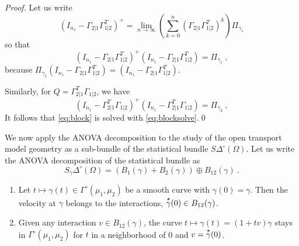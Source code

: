 \documentclass[runningheads]{llncs}
\begin{document}
\begin{proof}
  Let us write
%
\begin{equation*}
  (I_{n_1}-\Gamma_{2|1}\Gamma_{1|2}^T)^{+} = \lim_{n\to\infty} \left(\sum_{k=0}^n (\Gamma_{2|1}\Gamma_{1|2}^T)^k\right) \Pi_{\gamma_1}  
\end{equation*}
%
so that
%
\begin{equation*}
  (I_{n_1}-\Gamma_{2|1}\Gamma_{1|2}^T)^{+}(I_{n_1}-\Gamma_{2|1}\Gamma_{1|2}^T) = \Pi_{\gamma_1} \ ,
\end{equation*}
%
because $\Pi_{\gamma_1} (I_{n_1}-\Gamma_{2|1}\Gamma_{1|2}^T) = (I_{n_1}-\Gamma_{2|1}\Gamma_{1|2}^T)$.

Similarly, for $Q = \Gamma_{2|1}^T\Gamma_{1|2}$, we have
%
\begin{equation*}
  (I_{n_1}-\Gamma_{2|1}^T\Gamma_{1|2})^{+}(I_{n_1}-\Gamma_{2|1}^T\Gamma_{1|2}) = \Pi_{\gamma_2} \ ,
\end{equation*}
%
It follows that \cref{eq:block} is solved with \cref{eq:blocksolve}.\qed
\end{proof}

We now apply the ANOVA decomposition to the study of the open transport model geometry as a sub-bundle of the statistical bundle $S\Delta^\circ(\Omega)$. Let us write the ANOVA decomposition of the statistical bundle as
  \begin{equation*}
    S_\gamma \Delta^\circ(\Omega) = (B_1(\gamma) + B_2(\gamma)) \oplus B_{12}(\gamma) \ .
  \end{equation*}
 

  \begin{proposition} \begin{enumerate}\item Let $t \mapsto \gamma(t) \in \Gamma^\circ(\mu_1,\mu_2)$ be a smooth curve with $\gamma(0)=\gamma$.   Then the velocity at $\gamma$ belongs to the interactions, $\overset{\star}{\gamma}(0) \in B_{12}(\gamma)$.
      \item Given any interaction $v \in B_{12}(\gamma)$, the curve $t \mapsto \gamma(t) = (1+tv)\gamma$ stays in $\Gamma^\circ(\mu_1,\mu_2)$ for $t$ in a neighborhood of 0 and $v = \overset{\star}{\gamma}(0)$.
  \end{enumerate}
\end{proposition}
\end{document}
